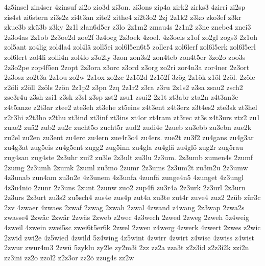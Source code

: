 {4z5insel
zin4ser
4zinsuf
zi2o
zio3d
zi3on.
zi3ons
zip4a
zirk2
zirks3
4zirri
zi2sp
zis4st
zi6stern
zi3s2z
zi4t3an
zite2
zithe4
zi2t3o2
2zj
2z1k2
z3ko
zko3ef
z3kr
zkue3b
zkü3b
z3ky
2z1l
zlan6d5er
z3lo
2z1m2
zmau4s
2z1n2
z3ne
znebe4
znei3
2z3o4as
2z1ob
2z3oe2d
zoe2f
3z4oeg
2z3oek
4zoel.
4z3oels
z1of
zo2gl
zogs3
2z1oh
zol5ant
zo4lig
zol4la4
zol4lä
zoll5ei
zol6l5en6t5
zoller4
zol6lerf
zol6l5erk
zol6l5erl
zol6lert
zol4li
zolli4n
zol4lo
z3o2ly
3zon
zon3s2
zon4teb
zon4t5er
3zo2o
zoo3s
2z3o2pe
zop4f5en
2zopt
2z3ora
z3orc
z3ord
z3org
zo2ri
zor4n3a
zor4ner
2z3ort
2z3osz
zo2t3a
2z1ou
zo2w
2z1ox
zo2ze
2z1ö2d
2z1ö2f
3zög
2z1ök
z1öl
2zöl.
2zöle
z2öli
z2öll
2zöls
2zön
2z1p2
z3pn
2zq
2z1r2
z3ra
z3ru
2z1s2
z3sa
zsau2
zsch2
zse3r4u
z3sh
zsi1
z3sk
z3sl
z3sp
zst2
zsu1
zsui2
2z1t
zt3abr
zta2n
z4t3an3e
z4t5anze
z2t3ar
ztee2
zte3eh
zt3ehe
zt5eins
z4t3ent
z4t3erz
z3t4es2
zte3sk
zt3hel
z2t3hi
z2t3ho
z2thu
zt3ind
zt3inf
zt3ins
zt4or
zt4ram
zt3rec
zt3s
z4t3urs
ztz2
zu1
zuae2
zuä2
zub2
zu2c
zucht5o
zucht5r
zud2
zudi4e
2zueb
zu3ebb
zu3ebn
zue2k
zu2el
zu2en
zu3ent
zu4erc
zu4ern
zue4r3o4
zu4ers.
zue2t
zu3f2
zu4gans
zu4g3ar
zu4g3at
zug5eis
zu4g5ent
zugg2
zug5inn
zu4gla
zu4glä
zu4glö
zug2r
zug5rau
zug4san
zug4ste
2z3uhr
zui2
zu3le
2z3ult
zu3lu
2z3um.
2z3umb
zumen4s
2zumf
2zumg
2z3umh
2zumk
2zuml
zu3mo
2zumr
2z3ums
2z3um2t
zu3m2u
2z3umw
4z3unab
zun4am
zu3n2e
4z3unem
4z3unfa
4zunfä
zunge4n5
4zunget
4z3ungl
4z3u4nio
2zunr
2z3uns
2zunt
2zunw
zuo2
zup4fi
zu3r4a
2z3urk
2z3url
2z3urn
2z3urs
2z3urt
zu3s2
zu5sch4
zus4e
zus4p
zut4a
zu3te
zut4r
zuve4
zuz2
2züb
zür3c
2zv
4zwaer
4zwaes
2zwaf
2zwag
2zwah
2zwal
4zwand
z4wang
2z3wap
2zwa2s
zwasse4
2zwäc
2zwär
2zwäs
2zweb
z2wec
4z3wech
2zwed
2zweg
2zweh
5z4weig
4zweil
4zwein
zwei5sc
zwei6t5er6k
2zwel
2zwen
z4werg
4zwerk
4zwert
2zwes
z2wic
2zwid
zwi2e
4z5wied
4zwild
5z4wing
4z5wint
4zwirr
4zwirt
z4wisc
4zwiss
z4wist
2zwur
zwur4m3
2zwü
5zyklu
zy2le
zy2m3i
2zz
zz2a
zza3t
z2z3id
z2z3i2k
zzi2n
zz3ini
zz2o
zzol2
z2z3or
zz2ö
zzug4s
zz2w
}

\endinput

